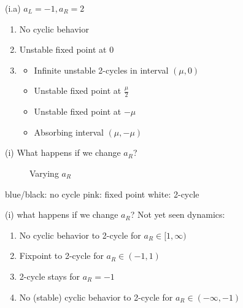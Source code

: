 \documentclass{beamer}
\newcounter{n}
\newcounter{f}
\begin{document}
\begin{frame}{(i.a) $a_L = -1, a_R = 2$}
    \begin{enumerate}
        \item[$\mu > 0$] No cyclic behavior
        \item[$\mu = 0$] Unstable fixed point at $0$
        \item[$\mu < 0$] \begin{itemize}
            \item Infinite unstable 2-cycles in interval $(\mu, 0)$
            \item Unstable fixed point at $\frac{\mu}{2}$
            \item Unstable fixed point at $-\mu$
            \item Absorbing interval $(\mu, -\mu)$
        \end{itemize}
    \end{enumerate}
\end{frame}

\begin{frame}{(i) What happens if we change $a_R$?}
    \begin{figure}
        \centering
         \qquad
        \caption{Varying $a_R$}
    \end{figure}
    
    blue/black: no cycle
    \hspace*{\fill}
    pink: fixed point
    \hspace*{\fill}
    white: 2-cycle
\end{frame}

\begin{frame}{(i) what happens if we change $a_R$?}
    Not yet seen dynamics:
    \begin{enumerate}
        \item[(0.a)] No cyclic behavior to 2-cycle for $a_R \in [1, \infty)$
        \item[(0.b)] Fixpoint to 2-cycle for $a_R \in (-1, 1)$
        \item[(0.c)] 2-cycle stays for $a_R = -1$
        \item[(0.d)] No (stable) cyclic behavior to 2-cycle for $a_R \in (-\infty, -1)$
    \end{enumerate}
\end{frame}
\end{document}
